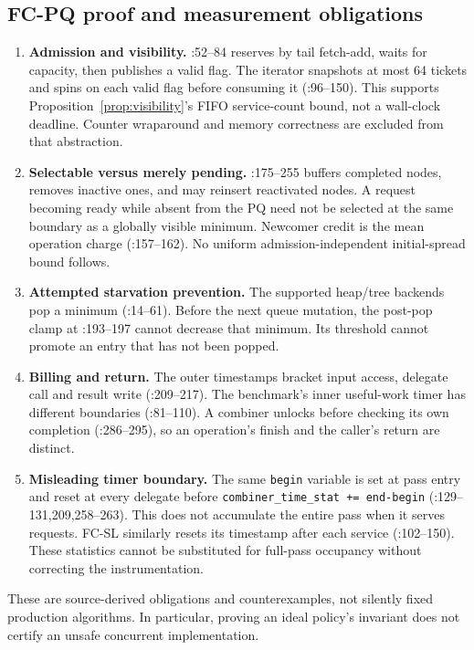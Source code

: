 \subsection{FC-PQ proof and measurement obligations}
\begin{enumerate}
\item \textbf{Admission and visibility.}
:52--84 reserves by tail fetch-add, waits for
capacity, then publishes a valid flag. The iterator snapshots at most 64
tickets and spins on each valid flag before consuming it (:96--150).
This supports Proposition~\ref{prop:visibility}'s FIFO service-count bound,
not a wall-clock deadline. Counter wraparound and memory correctness are
excluded from that abstraction.
\item \textbf{Selectable versus merely pending.}
:175--255 buffers completed nodes, removes inactive ones,
and may reinsert reactivated nodes. A request becoming ready while absent
from the PQ need not be selected at the same boundary as a globally visible
minimum. Newcomer credit is the mean operation charge (:157--162).
No uniform admission-independent initial-spread bound follows.
\item \textbf{Attempted starvation prevention.}
The supported heap/tree backends pop a minimum
(:14--61). Before the next queue mutation,
the post-pop clamp at :193--197 cannot decrease that
minimum. Its threshold cannot promote an entry that has not been popped.
\item \textbf{Billing and return.}
The outer timestamps bracket input access, delegate call and result write
(:209--217). The benchmark's inner useful-work timer has different boundaries
(:81--110).
A combiner unlocks before checking its own completion (:286--295), so an
operation's finish and the caller's return are distinct.
\item \textbf{Misleading timer boundary.}
The same \texttt{begin} variable is set at pass entry and reset at every
delegate before \texttt{combiner\_time\_stat += end-begin}
(:129--131,209,258--263). This does not accumulate the entire pass when it
serves requests. FC-SL similarly resets its timestamp after each service
(:102--150). These statistics cannot be substituted for
full-pass occupancy without correcting the instrumentation.
\end{enumerate}
These are source-derived obligations and counterexamples, not silently fixed
production algorithms. In particular, proving an ideal policy's invariant
does not certify an unsafe concurrent implementation.

